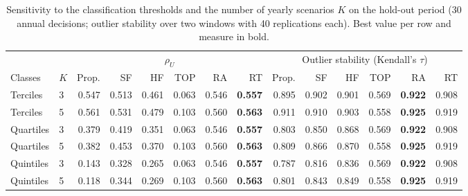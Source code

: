 \begin{table}[!htbp]
\centering
\scriptsize
\caption{Sensitivity to the classification thresholds and the number of yearly scenarios $K$ on the hold-out period (30 annual decisions; outlier stability over two windows with 40 replications each). Best value per row and measure in bold.}\label{tab:thresholds}
\begin{adjustbox}{max width=\textwidth}
\begin{tabular}{llrrrrrrrrrrrr}
\toprule
 & & \multicolumn{6}{c}{$\rho_U$} & \multicolumn{6}{c}{Outlier stability (Kendall's $\tau$)}\\
\cmidrule(lr){3-8}\cmidrule(lr){9-14}
Classes & $K$ & Prop. & SF & HF & TOP & RA & RT & Prop. & SF & HF & TOP & RA & RT \\
\midrule
Terciles & 3 & 0.547 & 0.513 & 0.461 & 0.063 & 0.546 & \textbf{0.557} & 0.895 & 0.902 & 0.901 & 0.569 & \textbf{0.922} & 0.908 \\
Terciles & 5 & 0.561 & 0.531 & 0.479 & 0.103 & 0.560 & \textbf{0.563} & 0.911 & 0.910 & 0.903 & 0.558 & \textbf{0.925} & 0.919 \\
Quartiles & 3 & 0.379 & 0.419 & 0.351 & 0.063 & 0.546 & \textbf{0.557} & 0.803 & 0.850 & 0.868 & 0.569 & \textbf{0.922} & 0.908 \\
Quartiles & 5 & 0.382 & 0.453 & 0.370 & 0.103 & 0.560 & \textbf{0.563} & 0.809 & 0.866 & 0.870 & 0.558 & \textbf{0.925} & 0.919 \\
Quintiles & 3 & 0.143 & 0.328 & 0.265 & 0.063 & 0.546 & \textbf{0.557} & 0.787 & 0.816 & 0.836 & 0.569 & \textbf{0.922} & 0.908 \\
Quintiles & 5 & 0.118 & 0.344 & 0.269 & 0.103 & 0.560 & \textbf{0.563} & 0.801 & 0.843 & 0.849 & 0.558 & \textbf{0.925} & 0.919 \\
\bottomrule
\end{tabular}
\end{adjustbox}
\end{table}
